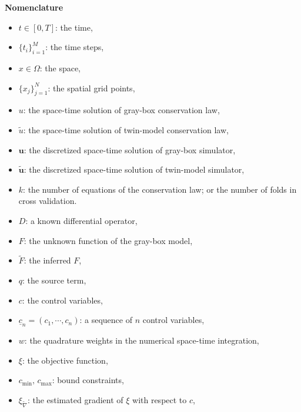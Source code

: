 \tableofcontents
\newpage
\listoffigures
\newpage
\listoftables

\clearpage
\hspace{-1.cm}\Huge{\textbf{Nomenclature}}\\\vspace{.5cm}
\normalsize
\begin{itemize}
    \item $t\in [0,T]$: the time,
    \item $\{t_i\}_{i=1}^M$: the time steps,
    \item $x\in \Omega$: the space,
    \item $\{x_j\}_{j=1}^N$: the spatial grid points,
    \item $u$: the space-time solution of gray-box conservation law,
    \item $\tilde{u}$: the space-time solution of twin-model conservation law,
    \item $\boldsymbol{u}$: the discretized space-time solution of gray-box simulator,
    \item $\tilde{\boldsymbol{u}}$: the discretized space-time solution of twin-model simulator,
    \item $k$: the number of equations of the conservation law; or the number of folds in
               cross validation.
    \item $D$: a known differential operator,
    \item $F$: the unknown function of the gray-box model,
    \item $\tilde{F}$: the inferred $F$,
    \item $q$: the source term,
    \item $c$: the control variables,
    \item $\underline{c}_n=(c_1, \cdots, c_n)$: a sequence of $n$ control variables,
    \item $w$: the quadrature weights in the numerical space-time integration,
    \item $\xi$: the objective function,
    \item $c_{\min}, \, c_{\max}$: bound constraints,
    \item $\xi_{\tilde{\nabla}}$: the estimated gradient of $\xi$ with respect to $c$,

\end{itemize}
